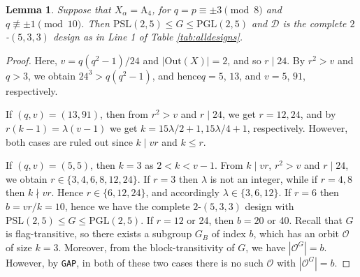\documentclass[a4paper,twopage,reqno,12pt]{amsart}
\newtheorem{lemma}[theorem]{Lemma}
\theoremstyle{definition}
\numberwithin{equation}{section}
\newcommand{\PSL}{\mathrm{PSL}}
\newcommand{\PGL}{\mathrm{PGL}}
\newcommand{\A}{\mathrm{A}}
\newcommand{\Out}{\mathrm{Out}}
\renewcommand{\leq}{\leqslant}
\renewcommand{\geq}{\geqslant}
\begin{document}
\begin{lemma}\label{case4}
Suppose that $X_{\alpha}=\A_4$, for $q=p\equiv \pm 3 \pmod 8$ and $q\not\equiv \pm 1\pmod{10}$. Then $\PSL(2,5)\leq G\leq \PGL(2,5)$ and $\mathcal{D}$ is the complete $2$-$(5,3,3)$ design as in Line 1 of Table \ref{tab:alldesigns}.
\end{lemma}
\begin{proof}
Here, $v=q(q^2-1)/24$ and $|\Out(X)|=2$, and so $r\mid 24$.
By $r^2>v$ and $q>3$, we obtain $24^3>q(q^2-1)$, and hence$q=5$, $13$, and $v=5$, $91$, respectively.

If $(q,v)=(13,91)$, then from $r^2>v$ and $r\mid 24$, 
we get $r=12,24$, and by $r(k-1)=\lambda(v-1)$ we get $k=15\lambda/2+1, 15\lambda/4+1$, respectively. However, both cases are ruled out since $k \mid vr$ and $k \leq r$.

If $(q,v)=(5,5)$, then $k=3$ as $2<k<v-1$.
From $k\mid vr$, $r^2>v$ and $r\mid 24$, 
we obtain $r\in \{3,4,6,8,12,24\}$. If $r=3$ then $\lambda$ is not an integer, while if $r=4,8$ then $k\nmid vr$. Hence $r\in \{6,12,24\}$, and accordingly $\lambda\in \{3,6,12\}$.
If $r=6$ then $b=vr/k=10$, hence we have the complete $2$-$(5,3,3)$ design with $\PSL(2,5)\leq G\leq \PGL(2,5)$.
If $r=12$ or 24, then $b=20$ or 40.
Recall that $G$ is flag-transitive, so there exists a subgroup $G_B$ of index $b$, which has an orbit $\mathcal{O}$ of size $k=3$. Moreover, from the block-transitivity of $G$, we have $\left\vert\mathcal{O}^{G}\right\vert=b$.
However, by \texttt{GAP}, in both of these two cases there is no such $\mathcal{O}$ with $|\mathcal{O}^{G}|=b$.

\end{proof}
\end{document}
